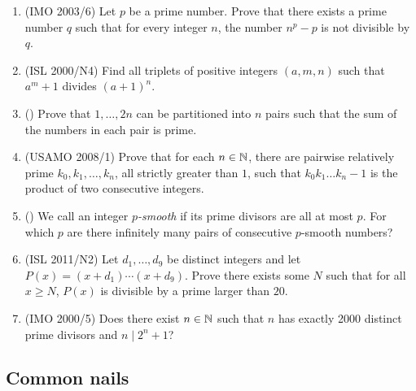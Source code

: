 \documentclass[11pt,paper=letter]{scrartcl}
\begin{document}
\begin{enumerate}

\item (IMO 2003/6) Let $p$ be a prime number. Prove that there exists a prime number $q$ such that for every integer $n$, the number $n^p - p$ is not divisible by $q$. \hint{\ref{h:1}}

\item (ISL 2000/N4) Find all triplets of positive integers $(a,m,n)$ such that $a^m + 1$ divides $(a + 1)^n$. \hint{\ref{h:2}}

\item (\cite{greenfield98}) Prove that $1, \ldots, 2n$ can be partitioned into $n$ pairs such that the sum of the numbers in each pair is prime. \hint{\ref{h:3}}

\item (USAMO 2008/1) Prove that for each $n \in \mathbb N$, there are pairwise relatively prime $k_0, k_1, \ldots, k_n$, all strictly greater than $ 1$, such that $ k_0k_1\ldots k_n-1$ is the product of two consecutive integers. \hint{\ref{h:4}}

\item (\href{https://mathoverflow.net/questions/106738}{}) We call an integer \textit{$p$-smooth} if its prime divisors are all at most $p$. For which $p$ are there infinitely many pairs of consecutive $p$-smooth numbers? \hint{\ref{h:5}}

\item (ISL 2011/N2) Let $d_1, \ldots, d_9$ be distinct integers and let $P(x) = (x + d_1) \cdots (x + d_9)$. Prove there exists some $N$ such that for all $x \ge N$, $P(x)$ is divisible by a prime larger than $20$. \hint{\ref{h:6}}

\item (IMO 2000/5) Does there exist $n \in \mathbb N$ such that $n$ has exactly 2000 distinct prime divisors and $n \mid 2^n + 1$? \hint{\ref{h:7}}

\end{enumerate}

\subsection{Common nails}
\end{document}
